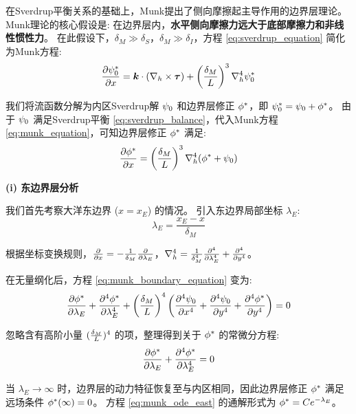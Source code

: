 在Sverdrup平衡关系的基础上，Munk提出了侧向摩擦起主导作用的边界层理论。
Munk理论的核心假设是: 在边界层内，\textbf{水平侧向摩擦力远大于底部摩擦力和非线性惯性力}。
在此假设下，$\delta_M \gg \delta_S$，$\delta_M \gg \delta_I$，方程 \eqref{eq:sverdrup_equation} 简化为Munk方程:
\begin{equation}
    \pde{\flayer{\streamfunc_0}}{x} = \kvec \cdot (\nabla_h \times \wind) + \left(\frac{\delta_M}{\hscale}\right)^3 \nabla_h^4 \flayer{\streamfunc_0}
    \label{eq:munk_equation}
\end{equation}

我们将流函数分解为内区Sverdrup解 $\psi_0$ 和边界层修正 $\phi^*$，即 $\psi_0^* = \psi_0 + \phi^*$。
由于 $\psi_0$ 满足Sverdrup平衡 \eqref{eq:sverdrup_balance}，代入Munk方程 \eqref{eq:munk_equation}，可知边界层修正 $\phi^*$ 满足:
\begin{equation}
    \pde{\flayer{\phi}}{x} = \left(\frac{\delta_M}{\hscale}\right)^3 \nabla_h^4 (\flayer{\phi} + \streamfunc_0)
    \label{eq:munk_boundary_equation}
\end{equation}

\textbf{(i) 东边界层分析}

我们首先考察大洋东边界 ($x = x_E$) 的情况。
引入东边界局部坐标 $\lambda_E$:
\begin{equation}
    \lambda_E = \frac{x_E - x}{\delta_M}
    \label{eq:munk_coord_east}
\end{equation}

根据坐标变换规则，$\pde{}{x} = -\frac{1}{\delta_M} \pde{}{\lambda_E}$，$\nabla_h^4 = \frac{1}{\delta_M^4} \pde[4]{}{\lambda_E} + \pde[4]{}{y}$。

在无量纲化后，方程 \eqref{eq:munk_boundary_equation} 变为:
\begin{equation*}
    \pde{\flayer{\phi}}{\lambda_E} + \pde[4]{\flayer{\phi}}{\lambda_E} + \left(\frac{\delta_M}{\hscale}\right)^4 \left(\pde[4]{\streamfunc_0}{x} + \pde[4]{\streamfunc_0}{y} + \pde[4]{\flayer{\phi}}{y}\right) = 0
\end{equation*}

忽略含有高阶小量 $(\frac{\delta_M}{L})^4$ 的项，整理得到关于 $\phi^*$ 的常微分方程:
\begin{equation}
    \pde{\flayer{\phi}}{\lambda_E} + \pde[4]{\flayer{\phi}}{\lambda_E} = 0
    \label{eq:munk_ode_east}
\end{equation}

当 $\lambda_E \to \infty$ 时，边界层的动力特征恢复至与内区相同，因此边界层修正 $\phi^*$ 满足远场条件 $\phi^*(\infty) = 0$。
方程 \eqref{eq:munk_ode_east} 的通解形式为 $\phi^* = C e^{-\lambda_E}$。


